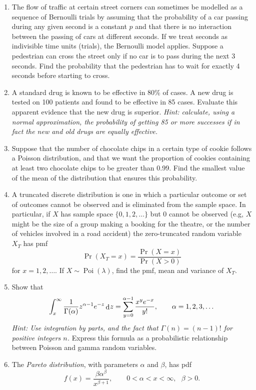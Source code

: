 \documentclass[
]{book}
\DeclareMathOperator{\Pois}{Poi}
\DeclareMathOperator{\dd}{d}
\newcommand{\dint}{\dd\hspace{0.5pt}\!}
\theoremstyle{definition}
\theoremstyle{definition}
\theoremstyle{definition}
\theoremstyle{definition}
\theoremstyle{remark}
\begin{document}
\begin{enumerate}
\def\labelenumi{\arabic{enumi}.}
\item
  The flow of traffic at certain street corners can sometimes be modelled as a sequence of Bernoulli trials by assuming that the probability of a car passing during any given second is a constant \(p\) and that there is no interaction between the passing of cars at different seconds. If we treat seconds as indivisible time units (trials), the Bernoulli model applies. Suppose a pedestrian can cross the street only if no car is to pass during the next 3 seconds. Find the probability that the pedestrian has to wait for exactly 4 seconds before starting to cross.
\item
  A standard drug is known to be effective in 80\% of cases. A new drug is tested on 100 patients and found to be effective in 85 cases. Evaluate this apparent evidence that the new drug is superior. \emph{Hint: calculate, using a normal approximation, the probability of getting 85 or more successes if in fact the new and old drugs are equally effective.}
\item
  Suppose that the number of chocolate chips in a certain type of cookie follows a Poisson distribution, and that we want the proportion of cookies containing at least two chocolate chips to be greater than 0.99. Find the smallest value of the mean of the distribution that ensures this probability.
\item
  A truncated discrete distribution is one in which a particular outcome or set of outcomes cannot be observed and is eliminated from the sample space. In particular, if \(X\) has sample space \(\{0,1,2,\dots\}\) but \(0\) cannot be observed (e.g, \(X\) might be the size of a group making a booking for the theatre, or the number of vehicles involved in a road accident) the zero-truncated random variable \(X_T\) has pmf
  \[
    \Pr(X_T=x) = \frac{\Pr(X=x)}{\Pr(X>0)}
  \]
  for \(x=1,2,\dots\).
  If \(X\sim\Pois(\lambda)\), find the pmf, mean and variance of \(X_T\).
\item
  Show that
  \[
    \int_x^\infty {\frac{1}{\Gamma(\alpha)}} z^{\alpha-1}e^{-z} \dint z = \sum_{y=0}^{\alpha-1} \frac{x^ye^{-x}}{y!}, \hspace{2em} \alpha=1,2,3,\dots
  \]
  \emph{Hint: Use integration by parts, and the fact that \(\Gamma(n)=(n-1)!\) for positive integers \(n\).} Express this formula as a probabilistic relationship between Poisson and gamma random variables.
\item
  The \emph{Pareto distribution}, with parameters \(\alpha\) and \(\beta\), has pdf
  \[
   f(x) = \frac{\beta\alpha^\beta}{x^{\beta+1}}, \hspace{2em} 0<\alpha < x < \infty, \ \ \ \beta >0.
   \]


\end{enumerate}
\end{document}
